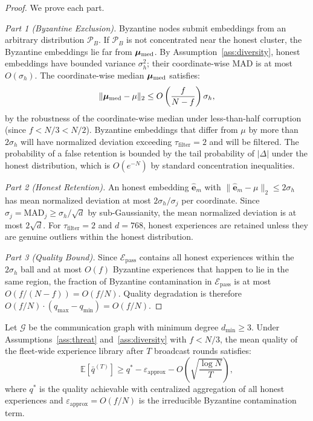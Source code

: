 \begin{proof}
We prove each part.

\textit{Part 1 (Byzantine Exclusion).}
Byzantine nodes submit embeddings from an arbitrary distribution $\mathcal{P}_B$.
If $\mathcal{P}_B$ is not concentrated near the honest cluster, the Byzantine
embeddings lie far from $\bm{\mu}_{\operatorname{med}}$. By Assumption~\ref{ass:diversity},
honest embeddings have bounded variance $\sigma_h^2$; their coordinate-wise MAD
is at most $O(\sigma_h)$. The coordinate-wise median $\bm{\mu}_{\operatorname{med}}$ satisfies:
\begin{equation}
    \|\bm{\mu}_{\operatorname{med}} - \mu\|_2 \leq O\left(\frac{f}{N-f}\right) \sigma_h,
\end{equation}
by the robustness of the coordinate-wise median under less-than-half corruption
(since $f < N/3 < N/2$). Byzantine embeddings that differ from $\mu$ by more
than $2\sigma_h$ will have normalized deviation exceeding $\tau_{\text{filter}} = 2$
and will be filtered. The probability of a false retention is bounded by
the tail probability of $|\Delta|$ under the honest distribution, which is
$O(e^{-N})$ by standard concentration inequalities.

\textit{Part 2 (Honest Retention).}
An honest embedding $\hat{\bm{e}}_m$ with $\|\hat{\bm{e}}_m - \mu\|_2 \leq
2\sigma_h$ has mean normalized deviation at most $2\sigma_h / \sigma_j$ per
coordinate. Since $\sigma_j = \text{MAD}_j \geq \sigma_h / \sqrt{d}$ by
sub-Gaussianity, the mean normalized deviation is at most $2\sqrt{d}$.
For $\tau_{\text{filter}} = 2$ and $d = 768$, honest experiences are retained
unless they are genuine outliers within the honest distribution.

\textit{Part 3 (Quality Bound).}
Since $\mathcal{E}_{\text{pass}}$ contains all honest experiences within the
$2\sigma_h$ ball and at most $O(f)$ Byzantine experiences that happen to lie
in the same region, the fraction of Byzantine contamination in $\mathcal{E}_{\text{pass}}$
is at most $O(f / (N - f)) = O(f/N)$. Quality degradation is therefore
$O(f/N) \cdot (q_{\max} - q_{\min}) = O(f/N)$.
\end{proof}

\begin{theorem}
\label{thm:convergence-ds}
Let $\mathcal{G}$ be the communication graph with minimum degree
$d_{\min} \geq 3$. Under Assumptions~\ref{ass:threat} and~\ref{ass:diversity}
with $f < N/3$, the mean quality of the fleet-wide experience library after
$T$ broadcast rounds satisfies:
\begin{equation}
    \mathbb{E}\left[\bar{q}^{(T)}\right] \geq q^*
    - \varepsilon_{\text{approx}} - O\left(\sqrt{\frac{\log N}{T}}\right),
    \label{eq:convergence-ds}
\end{equation}
where $q^*$ is the quality achievable with centralized aggregation of all
honest experiences and $\varepsilon_{\text{approx}} = O(f/N)$ is the
irreducible Byzantine contamination term.
\end{theorem}

